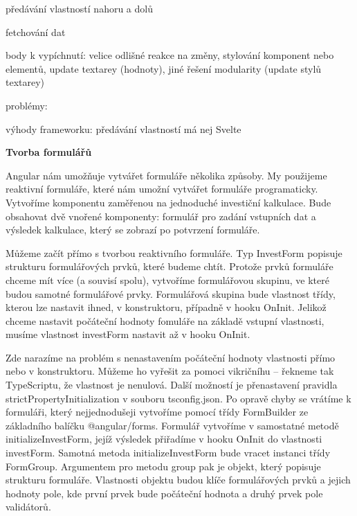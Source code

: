 \begin{citemize}
	\item předávání vlastností nahoru a dolů
	\item fetchování dat
	\item body k vypíchnutí: velice odlišné reakce na změny, stylování komponent nebo elementů, update textarey (hodnoty), jiné řešení modularity (update stylů textarey)
	\item problémy:
	\item výhody frameworku: předávání vlastností má nej Svelte
\end{citemize}

\begin{flushleft}
  \textbf{Tvorba formulářů}
\end{flushleft}

Angular nám umožňuje vytvářet formuláře několika způsoby. My použijeme reaktivní formuláře, které nám umožní vytvářet formuláře programaticky. 
Vytvoříme komponentu zaměřenou na jednoduché investiční kalkulace. 
Bude obsahovat dvě vnořené komponenty: formulář pro zadání vstupních dat a výsledek kalkulace, který se zobrazí po potvrzení formuláře.

Můžeme začít přímo s tvorbou reaktivního formuláře. Typ InvestForm popisuje strukturu formulářových prvků, které budeme chtít. 
Protože prvků formuláře chceme mít více (a souvisí spolu), vytvoříme formulářovou skupinu, ve které budou samotné formulářové prvky. 
Formulářová skupina bude vlastnost třídy, kterou lze nastavit ihned, v konstruktoru, případně v hooku OnInit. 
Jelikož chceme nastavit počáteční hodnoty fomuláře na základě vstupní vlastnosti, musíme vlastnost investForm nastavit až v hooku OnInit. 

Zde narazíme na problém s nenastavením počáteční hodnoty vlastnosti přímo nebo v konstruktoru. 
Můžeme ho vyřešit za pomoci vikričníhu -- řekneme tak TypeScriptu, že vlastnost je nenulová. Další možností je přenastavení pravidla strictPropertyInitialization v souboru tsconfig.json.
Po opravě chyby se vrátíme k formuláři, který nejjednodušeji vytvoříme pomocí třídy FormBuilder ze základního balíčku @angular/forms. 
Formulář vytvoříme v samostatné metodě initializeInvestForm, jejíž výsledek přiřadíme v hooku OnInit do vlastnosti investForm. 
Samotná metoda initializeInvestForm bude vracet instanci třídy FormGroup. Argumentem pro metodu group pak je objekt, který popisuje strukturu formuláře. 
Vlastnosti objektu budou klíče formulářových prvků a jejich hodnoty pole, kde první prvek bude počáteční hodnota a druhý prvek pole validátorů.

